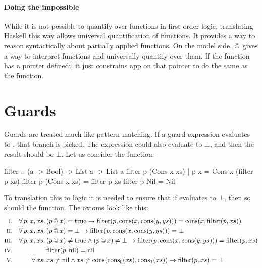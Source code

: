 \paragraph{Doing the impossible}
While it is not possible to quantify over functions in first order
logic, translating Haskell this way allows universal quantification of
functions.  It provides a way to reason syntactically about partially
applied functions. On the model side, $@$ gives a way to
interpret functions and universally quantify over them. If the
function has a pointer definedi, it just constrains app on that pointer
to do the same as the function.

\section{Guards}

Guards are treated much like pattern matching. If a
guard expression evaluates to , that branch is picked. The
expression could also evaluate to $\bot$, and then the result should
be $\bot$. Let us consider the  function:

\begin{code}
filter :: (a -> Bool) -> List a -> List a
filter p (Cons x xs) | p x = Cons x (filter p xs)
filter p (Cons x xs)       = filter p xs
filter p Nil               = Nil
\end{code}


To translation this to logic it is needed to ensure that if 
evaluates to $\bot$, then so should the function. The axioms look
like this:
\newcommand\filter[2]{\fn{filter}(#1,#2)}
\begin{align*}
\rom{1} && \faaa{p}{x}{xs} & (\app{p}{x}) = \fn{true}                                  \rightarrow \filter{p}{\cons{x}{\cons{y}{ys}}} = \cons{x}{\filter{p}{xs}} \\
\rom{2} && \faaa{p}{x}{xs} & (\app{p}{x}) = \bot                                       \rightarrow \filter{p}{\cons{x}{\cons{y}{ys}}} = \bot \\
\rom{3} && \faaa{p}{x}{xs} & (\app{p}{x}) \neq \fn{true} \wedge (\app{p}{x}) \neq \bot \rightarrow \filter{p}{\cons{x}{\cons{y}{ys}}} = \filter{p}{xs} \\
\rom{4} &&                 & \filter{p}{\fn{nil}} = \fn{nil} \\
\rom{5} && \fa{xs}         & xs \neq \fn{nil} \wedge xs \neq \uncons{xs} \rightarrow \filter{p}{xs} = \bot
\end{align*}

